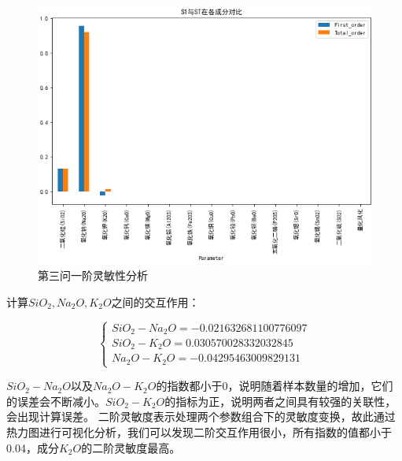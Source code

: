 \documentclass[UTF8]{ctexart}
\begin{document}
\begin{figure}[H]\centering
	\includegraphics[width=1\textwidth,height=0.7\textwidth]{img/S1_2.png} %
	\caption{第三问一阶灵敏性分析} %
	\label{fig:figure 9} %
\end{figure}

计算$SiO_2,Na_2O,K_2O$之间的交互作用：

\[\left\{\begin{array}{llcl}
    SiO_2-Na_2O = -0.021632681100776097      \\
SiO_2-K_2O =	0.030570028332032845		\\
Na_2O-K_2O =-0.04295463009829131
\end{array} \right.\]



$SiO_2-Na_2O$以及$Na_2O-K_2O$的指数都小于0，说明随着样本数量的增加，它们的误差会不断减小。$SiO_2-K_2O$的指标为正，说明两者之间具有较强的关联性，会出现计算误差。
二阶灵敏度表示处理两个参数组合下的灵敏度变换，故此通过热力图进行可视化分析，我们可以发现二阶交互作用很小，所有指数的值都小于0.04，成分$K_2O$的二阶灵敏度最高。
\end{document}

